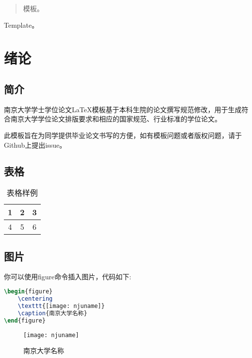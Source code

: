 \documentclass[
    TitleLength=1,%
]{njuthesis}
\begin{document}
\maketitle

\begin{abstract}
    模板。
\end{abstract}

\begin{englishabstract}
    Template。
\end{englishabstract}

\tableofcontents

\mainmatter

\chapter{绪论}
\section{简介}
南京大学学士学位论文\LaTeX 模板\cite{njuthesis}基于本科生院的论文撰写规范修改，用于生成符合南京大学学位论文排版要求和相应的国家规范、行业标准的学位论文。

此模板旨在为同学提供毕业论文书写的方便，如有模板问题或者版权问题，请于Github上提出issue。

\section{表格}
\begin{table}[htbp]
    \centering
    \caption{表格样例}
    \begin{tabular}{|c|c|c|}
        \hline
        1 & 2 & 3 \\
        \hline
        4 &  5 & 6 \\
        \hline
    \end{tabular}
\end{table}
\section{图片}
你可以使用figure命令插入图片，代码如下:
\begin{lstlisting}[language=TeX]
\begin{figure}
    \centering
    \texttt{[image: njuname]}
    \caption{南京大学名称}
\end{figure}
\end{lstlisting}
\begin{figure}[htbp]
\centering
\texttt{[image: njuname]}
\caption{南京大学名称}
\end{figure}
\end{document}
